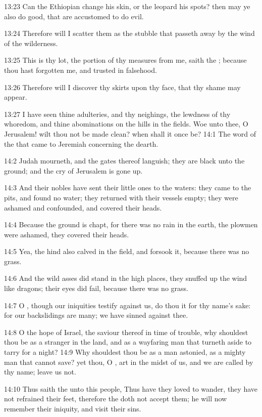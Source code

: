 13:23 Can the Ethiopian change his skin, or the leopard his spots?
then may ye also do good, that are accustomed to do evil.

13:24 Therefore will I scatter them as the stubble that passeth away
by the wind of the wilderness.

13:25 This is thy lot, the portion of thy measures from me, saith the
\LORD; because thou hast forgotten me, and trusted in falsehood.

13:26 Therefore will I discover thy skirts upon thy face, that thy
shame may appear.

13:27 I have seen thine adulteries, and thy neighings, the lewdness of
thy whoredom, and thine abominations on the hills in the fields. Woe
unto thee, O Jerusalem! wilt thou not be made clean? when shall it
once be?  14:1 The word of the \LORD that came to Jeremiah concerning
the dearth.

14:2 Judah mourneth, and the gates thereof languish; they are black
unto the ground; and the cry of Jerusalem is gone up.

14:3 And their nobles have sent their little ones to the waters: they
came to the pits, and found no water; they returned with their vessels
empty; they were ashamed and confounded, and covered their heads.

14:4 Because the ground is chapt, for there was no rain in the earth,
the plowmen were ashamed, they covered their heads.

14:5 Yea, the hind also calved in the field, and forsook it, because
there was no grass.

14:6 And the wild asses did stand in the high places, they snuffed up
the wind like dragons; their eyes did fail, because there was no
grass.

14:7 O \LORD, though our iniquities testify against us, do thou it for
thy name's sake: for our backslidings are many; we have sinned against
thee.

14:8 O the hope of Israel, the saviour thereof in time of trouble, why
shouldest thou be as a stranger in the land, and as a wayfaring man
that turneth aside to tarry for a night?  14:9 Why shouldest thou be
as a man astonied, as a mighty man that cannot save? yet thou, O \LORD,
art in the midst of us, and we are called by thy name; leave us not.

14:10 Thus saith the \LORD unto this people, Thus have they loved to
wander, they have not refrained their feet, therefore the \LORD doth
not accept them; he will now remember their iniquity, and visit their
sins.

